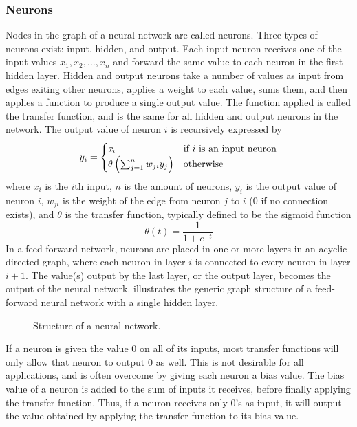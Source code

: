 \subsubsection{Neurons}
Nodes in the graph of a neural network are called neurons. Three types of neurons exist: input, hidden, and output. Each input neuron receives one of the input values $x_1, x_2, \dots, x_n$ and forward the same value to each neuron in the first hidden layer. Hidden and output neurons take a number of values as input from edges exiting other neurons, applies a weight to each value, sums them, and then applies a function to produce a single output value. The function applied is called the transfer function, and is the same for all hidden and output neurons in the network. The output value of neuron $i$ is recursively expressed by 
\begin{equation*}\label{eq:weightcalc}
  y_i =
  \begin{cases}
    \mathit{x}_i                     & \text{if } i \text{ is an input neuron} \\
    \theta\left(\sum_{j=1}^n w_{ji} y_{j}\right) & \text{otherwise}
  \end{cases}
\end{equation*}
%
where $x_i$ is the $i$th input, $n$ is the amount of neurons, $y_i$ is the output value of neuron $i$, $w_{ji}$ is the weight of the edge from neuron $j$ to $i$ ($0$ if no connection exists), and $\theta$ is the transfer function, typically defined to be the sigmoid function
%
\begin{equation*}
  \theta\left(t\right) = \frac{1}{1+e^{-t}}
\end{equation*}
%
In a feed-forward network, neurons are placed in one or more layers in an acyclic directed graph, where each neuron in layer $i$ is connected to every neuron in layer $i + 1$. The value(s) output by the last layer, or the output layer, becomes the output of the neural network.  illustrates the generic graph structure of a feed-forward neural network with a single hidden layer.
%
\begin{figure}[htpb]
  \centering
  \caption{Structure of a neural network.}
  \label{fig:ann}
\end{figure}
%
If a neuron is given the value $0$ on all of its inputs, most transfer functions will only allow that neuron to output $0$ as well. This is not desirable for all applications, and is often overcome by giving each neuron a bias value. The bias value of a neuron is added to the sum of inputs it receives, before finally applying the transfer function. Thus, if a neuron receives only $0$'s as input, it will output the value obtained by applying the transfer function to its bias value.

